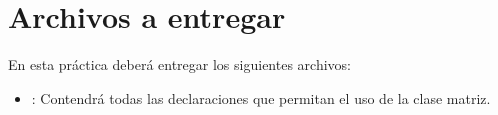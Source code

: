 \section{Archivos a entregar}

En esta práctica deberá entregar los siguientes archivos:

\begin{itemize}
\item {}: Contendrá todas las declaraciones que permitan el uso de la clase matriz.
\end{itemize}
